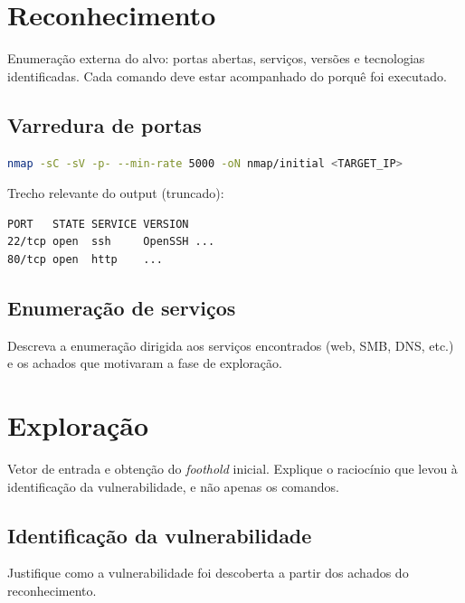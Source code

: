 \documentclass[12pt,a4paper]{article}
\begin{document}
\section{Reconhecimento}
Enumeração externa do alvo: portas abertas, serviços, versões e tecnologias
identificadas. Cada comando deve estar acompanhado do porquê foi executado.

\subsection{Varredura de portas}
\begin{lstlisting}[language=bash,caption={Varredura inicial de portas e serviços com Nmap.}]
nmap -sC -sV -p- --min-rate 5000 -oN nmap/initial <TARGET_IP>
\end{lstlisting}

Trecho relevante do output (truncado):
\begin{lstlisting}[style=output,caption={Serviços expostos identificados na varredura.}]
PORT   STATE SERVICE VERSION
22/tcp open  ssh     OpenSSH ...
80/tcp open  http    ...
\end{lstlisting}

\subsection{Enumeração de serviços}
Descreva a enumeração dirigida aos serviços encontrados (web, SMB, DNS, etc.)
e os achados que motivaram a fase de exploração.

\section{Exploração}
Vetor de entrada e obtenção do \emph{foothold} inicial. Explique o raciocínio
que levou à identificação da vulnerabilidade, e não apenas os comandos.

\subsection{Identificação da vulnerabilidade}
Justifique como a vulnerabilidade foi descoberta a partir dos achados do
reconhecimento.
\end{document}
